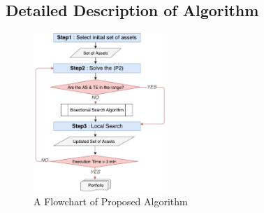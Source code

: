\documentclass[11pt]{article}
\begin{document}
\subsection{Detailed Description of Algorithm}
\begin{figure}[] 
	\begin{center}
		\includegraphics[width=0.45\textwidth]{flowchart}
		\caption{A Flowchart of Proposed Algorithm} \label{fig:flowchart}
	\end{center}
\end{figure}
\end{document}
